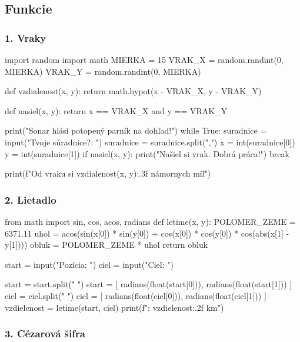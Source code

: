 \subsection{Funkcie}

\subsubsection*{1. Vraky}
\begin{solution}
import random
import math
MIERKA = 15
VRAK_X = random.randint(0, MIERKA)
VRAK_Y = random.randint(0, MIERKA)

def vzdialenost(x, y):
    return math.hypot(x - VRAK_X, y - VRAK_Y)
  
def nasiel(x, y):
    return x == VRAK_X and y == VRAK_Y

print("Sonar hlási potopený parník na dohľad!")
while True:
    suradnice = input("Tvoje súradnice?: ")
    suradnice = suradnice.split(",")
    x = int(suradnice[0])
    y = int(suradnice[1])
    if nasiel(x, y):
        print("Našiel si vrak. Dobrá práca!")
        break

    print(f"Od vraku si {vzdialenost(x, y):.3f} námornych míľ")
\end{solution}


\subsubsection*{2. Lietadlo}
\begin{solution}
from math import sin, cos, acos, radians
def letime(x, y):
    POLOMER_ZEME = 6371.11
    uhol = acos(sin(x[0]) * sin(y[0]) +
                cos(x[0]) * cos(y[0]) * cos(abs(x[1] - y[1])))
    obluk = POLOMER_ZEME * uhol
    return obluk

start = input("Pozícia: ")
ciel = input("Cieľ: ")

start = start.split(" ")
start = [
    radians(float(start[0])),
    radians(float(start[1]))
]
ciel = ciel.split(" ")
ciel = [
    radians(float(ciel[0])),
    radians(float(ciel[1]))
]
vzdielenost = letime(start, ciel)
print(f": {vzdielenost:.2f} km")
\end{solution}


\subsubsection*{3. Cézarová šifra}


